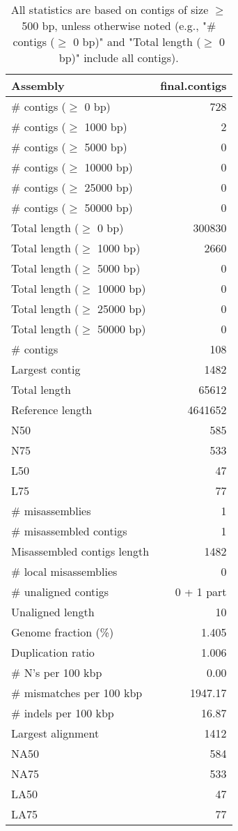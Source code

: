 \documentclass[12pt,a4paper]{article}
\begin{document}
\begin{table}[ht]
\begin{center}
\caption{All statistics are based on contigs of size $\geq$ 500 bp, unless otherwise noted (e.g., "\# contigs ($\geq$ 0 bp)" and "Total length ($\geq$ 0 bp)" include all contigs).}
\begin{tabular}{|l*{1}{|r}|}
\hline
Assembly & final.contigs \\ \hline
\# contigs ($\geq$ 0 bp) & 728 \\ \hline
\# contigs ($\geq$ 1000 bp) & 2 \\ \hline
\# contigs ($\geq$ 5000 bp) & 0 \\ \hline
\# contigs ($\geq$ 10000 bp) & 0 \\ \hline
\# contigs ($\geq$ 25000 bp) & 0 \\ \hline
\# contigs ($\geq$ 50000 bp) & 0 \\ \hline
Total length ($\geq$ 0 bp) & 300830 \\ \hline
Total length ($\geq$ 1000 bp) & 2660 \\ \hline
Total length ($\geq$ 5000 bp) & 0 \\ \hline
Total length ($\geq$ 10000 bp) & 0 \\ \hline
Total length ($\geq$ 25000 bp) & 0 \\ \hline
Total length ($\geq$ 50000 bp) & 0 \\ \hline
\# contigs & 108 \\ \hline
Largest contig & 1482 \\ \hline
Total length & 65612 \\ \hline
Reference length & 4641652 \\ \hline
N50 & 585 \\ \hline
N75 & 533 \\ \hline
L50 & 47 \\ \hline
L75 & 77 \\ \hline
\# misassemblies & 1 \\ \hline
\# misassembled contigs & 1 \\ \hline
Misassembled contigs length & 1482 \\ \hline
\# local misassemblies & 0 \\ \hline
\# unaligned contigs & 0 + 1 part \\ \hline
Unaligned length & 10 \\ \hline
Genome fraction (\%) & 1.405 \\ \hline
Duplication ratio & 1.006 \\ \hline
\# N's per 100 kbp & 0.00 \\ \hline
\# mismatches per 100 kbp & 1947.17 \\ \hline
\# indels per 100 kbp & 16.87 \\ \hline
Largest alignment & 1412 \\ \hline
NA50 & 584 \\ \hline
NA75 & 533 \\ \hline
LA50 & 47 \\ \hline
LA75 & 77 \\ \hline
\end{tabular}
\end{center}
\end{table}
\end{document}
